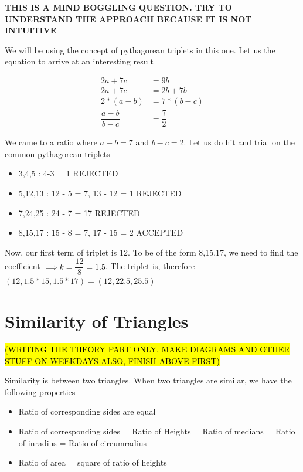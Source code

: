 
\textbf{THIS IS A MIND BOGGLING QUESTION. TRY TO UNDERSTAND THE APPROACH BECAUSE IT IS NOT INTUITIVE}

We will be using the concept of pythagorean triplets in this one. Let us the equation to arrive at an interesting result

\begin{align*}
    2a + 7c &= 9b \\
    2a + 7c &= 2b + 7b \\
    2 * (a - b) &= 7 * (b - c) \\
    \dfrac{a - b}{b - c} &= \dfrac{7}{2}
\end{align*}

We came to a ratio where $a - b = 7$ and $b - c = 2$. Let us do hit and trial on the common pythagorean triplets
\begin{itemize}
    \item 3,4,5 : 4-3 = 1 REJECTED
    \item 5,12,13 : 12 - 5 = 7, 13 - 12 = 1 REJECTED
    \item 7,24,25 : 24 - 7 = 17 REJECTED
    \item 8,15,17 : 15 - 8 = 7, 17 - 15 = 2 ACCEPTED
\end{itemize}

Now, our first term of triplet is 12. To be of the form 8,15,17, we need to find the coefficient $\implies k = \dfrac{12}{8} = 1.5$. The triplet is, therefore $(12, 1.5 * 15, 1.5 * 17) = (12,22.5,25.5)$








\newpage

\section{Similarity of Triangles}

\hl{(WRITING THE THEORY PART ONLY. MAKE DIAGRAMS AND OTHER STUFF ON WEEKDAYS ALSO, FINISH ABOVE FIRST)}

Similarity is between two triangles. When two triangles are similar, we have the following properties
\begin{itemize}
    \item Ratio of corresponding sides are equal
    \item Ratio of corresponding sides = Ratio of Heights = Ratio of medians = Ratio of inradius = Ratio of circumradius
    \item Ratio of area = square of ratio of heights
\end{itemize}





